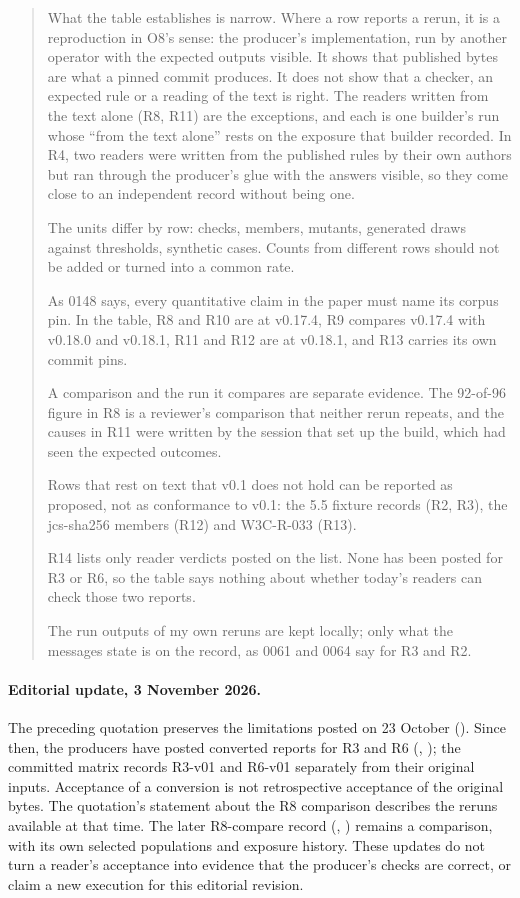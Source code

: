 \begin{quote}
What the table establishes is narrow. Where a row reports a rerun, it is a reproduction in O8's sense: the producer's implementation, run by another operator with the expected outputs visible. It shows that published bytes are what a pinned commit produces. It does not show that a checker, an expected rule or a reading of the text is right. The readers written from the text alone (R8, R11) are the exceptions, and each is one builder's run whose ``from the text alone'' rests on the exposure that builder recorded. In R4, two readers were written from the published rules by their own authors but ran through the producer's glue with the answers visible, so they come close to an independent record without being one.

The units differ by row: checks, members, mutants, generated draws against thresholds, synthetic cases. Counts from different rows should not be added or turned into a common rate.

As 0148 says, every quantitative claim in the paper must name its corpus pin. In the table, R8 and R10 are at v0.17.4, R9 compares v0.17.4 with v0.18.0 and v0.18.1, R11 and R12 are at v0.18.1, and R13 carries its own commit pins.

A comparison and the run it compares are separate evidence. The 92-of-96 figure in R8 is a reviewer's comparison that neither rerun repeats, and the causes in R11 were written by the session that set up the build, which had seen the expected outcomes.

Rows that rest on text that v0.1 does not hold can be reported as proposed, not as conformance to v0.1: the 5.5 fixture records (R2, R3), the jcs-sha256 members (R12) and W3C-R-033 (R13).

R14 lists only reader verdicts posted on the list. None has been posted for R3 or R6, so the table says nothing about whether today's readers can check those two reports.

The run outputs of my own reruns are kept locally; only what the messages state is on the record, as 0061 and 0064 say for R3 and R2.
\end{quote}

\paragraph{Editorial update, 3 November 2026.} The preceding quotation preserves the limitations posted on 23 October (). Since then, the producers have posted converted reports for R3 and R6 (, ); the committed matrix records R3-v01 and R6-v01 separately from their original inputs. Acceptance of a conversion is not retrospective acceptance of the original bytes. The quotation's statement about the R8 comparison describes the reruns available at that time. The later R8-compare record (, ) remains a comparison, with its own selected populations and exposure history. These updates do not turn a reader's acceptance into evidence that the producer's checks are correct, or claim a new execution for this editorial revision.

